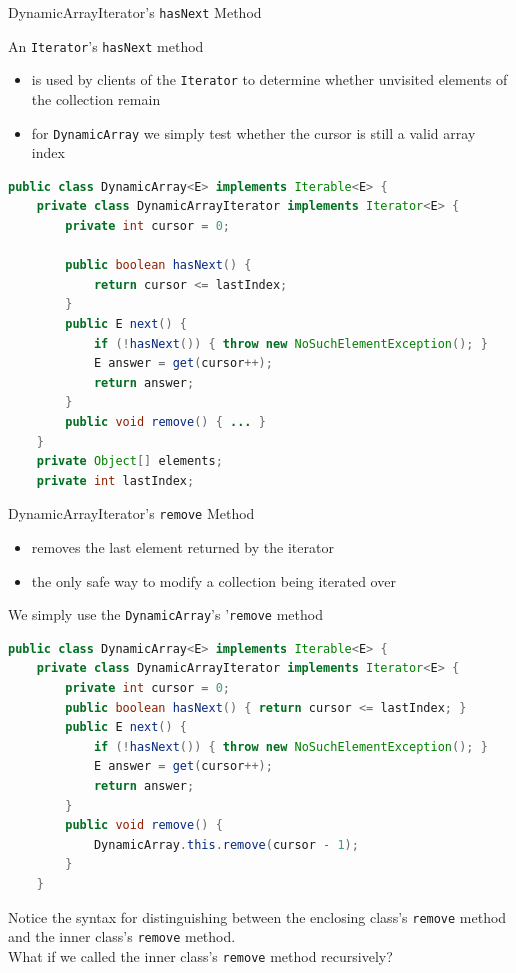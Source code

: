 \documentclass{beamer}
\begin{document}
\begin{frame}[fragile]{DynamicArrayIterator's {\tt hasNext} Method}

An {\tt Iterator}'s {\tt hasNext} method

\begin{itemize}
\item is used by clients of the {\tt Iterator} to determine whether unvisited elements of the collection remain
\item for {\tt DynamicArray} we simply test whether the cursor is still a valid array index
\end{itemize}

\begin{lstlisting}[language=Java]
public class DynamicArray<E> implements Iterable<E> {
    private class DynamicArrayIterator implements Iterator<E> {
        private int cursor = 0;

        public boolean hasNext() {
            return cursor <= lastIndex;
        }
        public E next() {
            if (!hasNext()) { throw new NoSuchElementException(); }
            E answer = get(cursor++);
            return answer;
        }
        public void remove() { ... }
    }
    private Object[] elements;
    private int lastIndex;
\end{lstlisting}

\end{frame}

\begin{frame}[fragile]{DynamicArrayIterator's {\tt remove} Method}
\vspace{-.05in}
\begin{itemize}
\item removes the last element returned by the iterator
\item the only safe way to modify a collection being iterated over
\end{itemize}
We simply use the {\tt DynamicArray}'s '{\tt remove} method
\vspace{-.05in}
\begin{lstlisting}[language=Java]
public class DynamicArray<E> implements Iterable<E> {
    private class DynamicArrayIterator implements Iterator<E> {
        private int cursor = 0;
        public boolean hasNext() { return cursor <= lastIndex; }
        public E next() {
            if (!hasNext()) { throw new NoSuchElementException(); }
            E answer = get(cursor++);
            return answer;
        }
        public void remove() {
            DynamicArray.this.remove(cursor - 1);
        }
    }
\end{lstlisting}
\vspace{-.05in}
Notice the syntax for distinguishing between the enclosing class's {\tt remove} method and the inner class's {\tt remove} method.\\
What if we called the inner class's {\tt remove} method recursively?
\end{frame}
\end{document}
